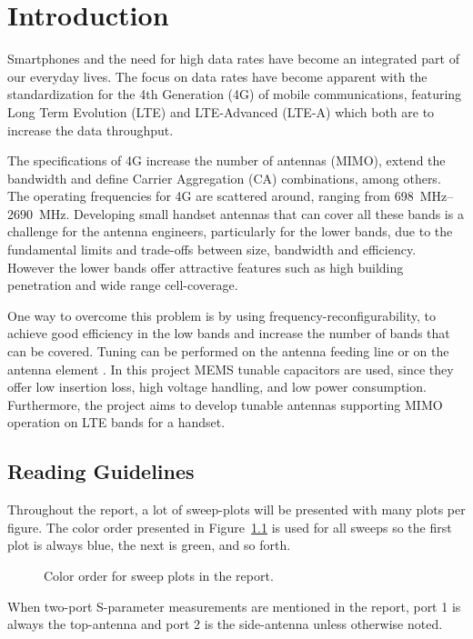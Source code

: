 \chapter{Introduction}
\label{cha:intro}
Smartphones and the need for high data rates have become an integrated part of our everyday lives. The focus on data rates have become apparent with the standardization for the 4th Generation (4G) of mobile communications, featuring Long Term Evolution (LTE) and LTE-Advanced (LTE-A) which both are to increase the data throughput. 

The specifications of 4G increase the number of antennas (MIMO), extend the bandwidth and define Carrier Aggregation (CA) combinations, among others. The operating frequencies for 4G are scattered around, ranging from \SIrange{698}{2690}{MHz}. Developing small handset antennas that can cover all these bands is a challenge for the antenna engineers, particularly for the lower bands, due to the fundamental limits and trade-offs between size, bandwidth and efficiency\cite{}. However the lower bands offer attractive features such as high building penetration and wide range cell-coverage. 

One way to overcome this problem is by using frequency-reconfigurability, to achieve good efficiency in the low bands and increase the number of bands that can be covered. Tuning can be performed on the antenna feeding line \cite{} \cite{} or on the antenna element \cite{} \cite{}. In this project MEMS tunable capacitors are used, since they offer low insertion loss, high voltage handling, and low power consumption\cite{}. Furthermore, the project aims to develop tunable antennas supporting MIMO operation on LTE bands for a handset. 

\section{Reading Guidelines}
Throughout the report, a lot of sweep-plots will be presented with many plots per figure. The color order presented in Figure~\ref{fig:colororder} is used for all sweeps so the first plot is always blue, the next is green, and so forth.

\begin{figure}[htbp]
    \centering
    \caption{Color order for sweep plots in the report.}
    \label{fig:colororder}
\end{figure}

When two-port S-parameter measurements are mentioned in the report, port 1 is always the top-antenna and port 2 is the side-antenna unless otherwise noted.

